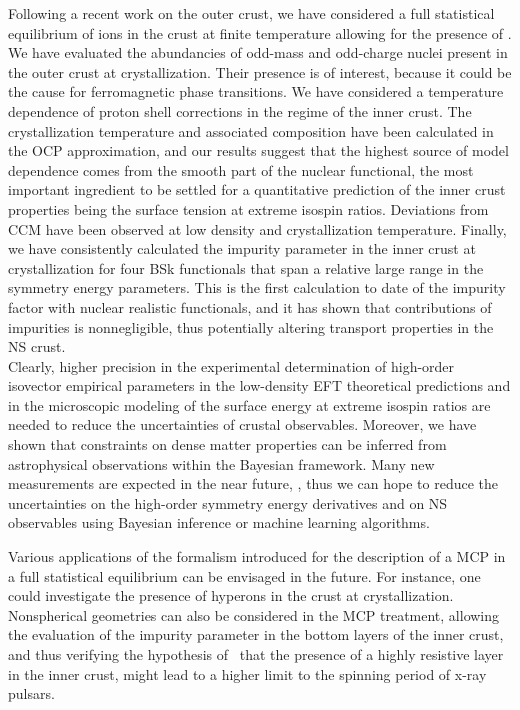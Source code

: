 Following a recent work on the outer crust, we have considered a full
statistical equilibrium of ions in the crust at finite temperature allowing for 
the presence of . We have evaluated the 
abundancies of odd-mass and odd-charge nuclei present in the outer crust at 
crystallization. Their presence is of interest, because it could be the cause 
for ferromagnetic phase transitions. 
We have considered a temperature dependence of proton shell corrections in the 
regime of the inner crust. The crystallization temperature and associated
composition have been calculated in the OCP approximation, and our results
suggest that the highest source of model dependence comes from the smooth part
of the nuclear functional, the most important ingredient to be settled for a
quantitative prediction of the inner crust properties being the surface tension
at extreme isospin ratios. 
Deviations from CCM have been observed at low density and crystallization
temperature. 
Finally, we have consistently calculated the impurity parameter in the inner 
crust at crystallization for four BSk functionals that span a relative large 
range in the symmetry energy parameters. This is the first calculation to date
of the impurity factor with nuclear realistic functionals, and it has shown 
that contributions of impurities is nonnegligible, thus potentially altering 
transport properties in the NS crust.
\\

Clearly, higher precision in the experimental determination of high-order
isovector empirical parameters in the low-density EFT theoretical predictions 
and in the microscopic modeling of the surface energy at extreme isospin ratios 
are needed to reduce the uncertainties of crustal observables. Moreover, 
we have shown that constraints on dense matter properties can be inferred from 
astrophysical observations within the Bayesian framework. 
Many new measurements are expected in the near future, , thus we can hope to reduce the 
uncertainties on the high-order symmetry energy derivatives and on NS 
observables using Bayesian inference or machine learning algorithms.

Various applications of the formalism introduced for the description of a MCP 
in a full statistical equilibrium can be envisaged in the future. For instance, 
one could investigate the presence of hyperons in the crust at crystallization. 
Nonspherical geometries can also be considered in the MCP treatment, allowing 
the evaluation of the impurity parameter in the bottom layers of the inner 
crust, and thus verifying the hypothesis of~\cite{Pons2013} that the presence
of a highly resistive layer in the inner crust, might lead to a higher limit to
the spinning period of x-ray pulsars.

